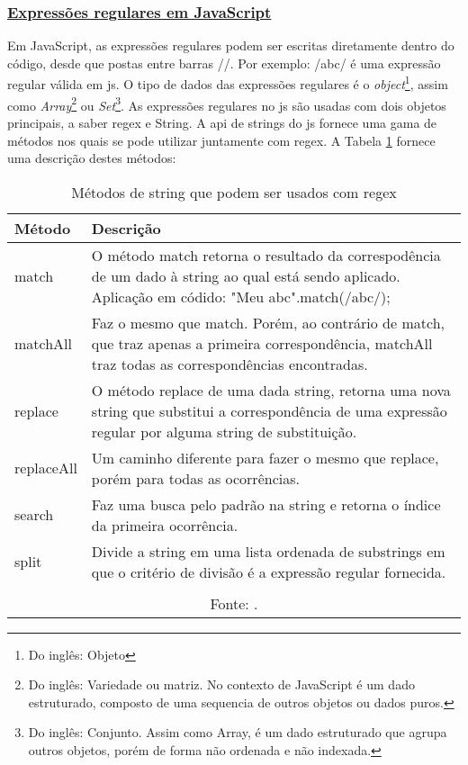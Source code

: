 \subsubsection{\underline{Expressões regulares em JavaScript}}

Em JavaScript, as expressões regulares podem ser escritas diretamente dentro do código,
desde que postas entre barras //. Por exemplo: /abc/ é uma expressão regular válida em
\acrshort{js}.
O tipo de dados das expressões regulares é
o
\textit{object}\footnote{Do inglês: Objeto
}, assim como
\textit{Array}\footnote{Do inglês: Variedade ou matriz. No contexto de JavaScript é um dado estruturado,
    composto de uma sequencia de outros objetos ou dados puros.
}
ou
\textit{Set}\footnote{Do inglês: Conjunto. Assim como Array, é um dado estruturado que agrupa outros
    objetos, porém de forma não ordenada e não indexada.
}. As expressões regulares no
\acrshort{js}
são usadas com dois objetos principais, a saber
\acrshort{regex}
e
String.
A
\acrshort{api}
de strings do
\acrshort{js}
fornece uma gama de métodos nos quais se pode utilizar
juntamente com
\acrshort{regex}.
A Tabela \ref{tbl:string-methods-regex}
fornece uma descrição destes métodos:

\begin{table}[H]
    \centering
    \caption{Métodos de string que podem ser usados com regex}
    \label{tbl:string-methods-regex}
    \renewcommand{\arraystretch}{1.5}
    \begin{tabular}{p{2.4000cm} p{13.6000cm}}
        \hline
        \textbf{Método} & \textbf{Descrição} \\
        \hline
        match & O método match retorna o resultado da correspodência de um dado
            \cite{mdn-regex}
            à string ao qual está sendo aplicado. Aplicação em códido:
            "Meu abc".match(/abc/);
         \\
		matchAll & Faz o mesmo que match. Porém, ao contrário de match, que traz apenas
            a primeira correspondência, matchAll traz todas as correspondências
            encontradas.
         \\
		replace & O método replace de uma dada string, retorna uma nova string que substitui
            a correspondência de uma expressão regular por alguma string de substituição.
         \\
		replaceAll & Um caminho diferente para fazer o mesmo que replace, porém para todas
            as ocorrências.
         \\
		search & Faz uma busca pelo padrão na string e retorna o índice da primeira ocorrência. \\
		split & Divide a string em uma lista ordenada de substrings em que o critério de divisão é a expressão regular fornecida. \\
        \hline
        \\\multicolumn{2}{c}{\fontsize{10pt}{12pt}Fonte: \cite{mdn-regex}.}
    \end{tabular}
\end{table}

